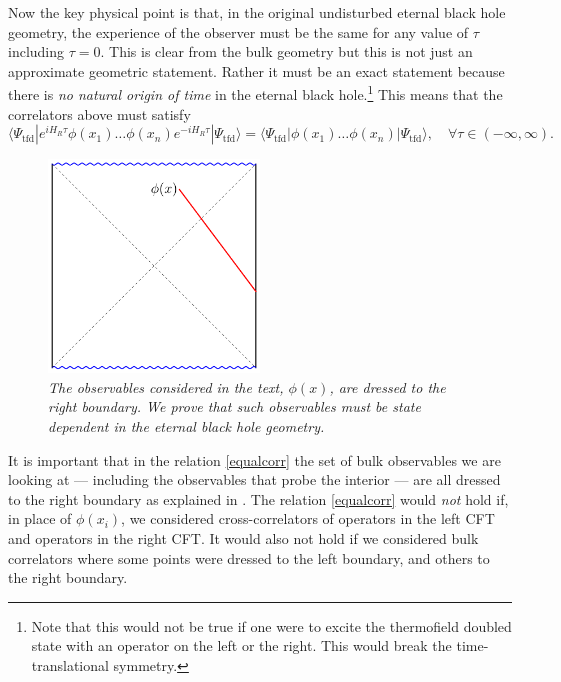 \documentclass[12pt]{article}
\newcommand{\tfd}{\Psi_{\text{tfd}}} %
\newcommand{\be}{\begin{equation}}
\newcommand{\ee}{\end{equation}}
\begin{document}
Now the key physical point is that,  in the original undisturbed eternal black hole geometry, the experience of the observer must be the same for any value of $\tau$ including $\tau = 0$. This is clear from the bulk geometry but this is not just an approximate geometric statement. Rather it must be an exact statement because there is {\em no natural origin of time} in the eternal black hole.\footnote{Note that this would not be true if one were to excite the thermofield doubled state with an operator on the left or the right. This would break the time-translational symmetry.} This means that the correlators above must satisfy 
\be
\label{equalcorr}
\langle \tfd | e^{i H_R \tau} \phi(x_1) \ldots \phi(x_n) e^{-i H_R \tau} |\tfd \rangle =\langle \tfd | \phi(x_1) \ldots \phi(x_n) |\tfd \rangle, \quad \forall \tau \in (-\infty, \infty).
\ee

\begin{figure}[!ht]
\begin{center}
\includegraphics[width=0.5\textwidth]{dressedobservable.pdf}
\caption{\em The observables considered in the text, $\phi(x)$, are dressed to the right boundary. We prove that such observables must be state dependent in the eternal black hole geometry. \label{dressedobservable}}
\end{center}
\end{figure}
It is important that in the relation \eqref{equalcorr} the set of bulk observables we are looking at  --- including the observables that probe the interior --- are all dressed to the right boundary as explained in \cite{Papadodimas:2015xma,Papadodimas:2015jra}.    The relation \eqref{equalcorr} would {\em not} hold if, in place of $\phi(x_i)$, we considered cross-correlators of operators in the left CFT and operators in the right CFT. It would also not hold if we considered bulk correlators where some points were dressed to the left boundary, and others to the right boundary.
\end{document}
